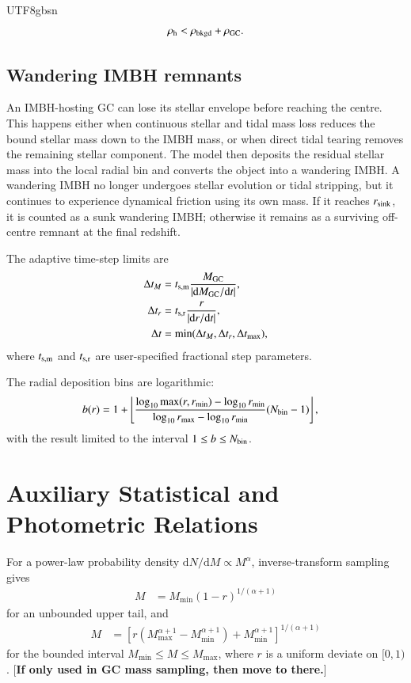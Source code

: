 \documentclass[trackchanges, twocolappendix, twocolumn]{aastex701}
\newcommand{\czkong}[1]{{\color{magenta}[\textbf{#1}]}}
\begin{document}
\begin{CJK*}{UTF8}{gbsn}
\begin{align}
\rho_{\rm h} < \rho_{\rm bkgd}+\rho_{\rm GC} .
\end{align}

\subsection{Wandering IMBH remnants}
\label{subsubsect:wandered_imbh}

An IMBH-hosting GC can lose its stellar envelope before reaching the centre. This happens either when continuous stellar and tidal mass loss reduces the bound stellar mass down to the IMBH mass, or when direct tidal tearing removes the remaining stellar component. The model then deposits the residual stellar mass into the local radial bin and converts the object into a wandering IMBH\@. A wandering IMBH no longer undergoes stellar evolution or tidal stripping, but it continues to experience dynamical friction using its own mass. If it reaches $r_{\rm sink}$, it is counted as a sunk wandering IMBH; otherwise it remains as a surviving off-centre remnant at the final redshift.

The adaptive time-step limits are
\begin{align}
\Delta t_M &= t_{\rm s,m}\dfrac{M_{\rm GC}}{|\mathrm{d}M_{\rm GC}/\mathrm{d}t|},\\
\Delta t_r &= t_{\rm s,r}\dfrac{r}{|\mathrm{d}r/\mathrm{d}t|},\\
\Delta t &= \min(\Delta t_M,\Delta t_r,\Delta t_{\max}),
\end{align}
where $t_{\rm s,m}$ and $t_{\rm s,r}$ are user-specified fractional step parameters.

The radial deposition bins are logarithmic:
\begin{align}
b(r) &= 1+\left\lfloor
\dfrac{\log_{10}\max(r,r_{\min})-\log_{10}r_{\min}}
{\log_{10}r_{\max}-\log_{10}r_{\min}}
(N_{\rm bin}-1)
\right\rfloor ,
\end{align}
with the result limited to the interval $1\leq b\leq N_{\rm bin}$.

\section{Auxiliary Statistical and Photometric Relations}
\label{app:auxiliary_equations}

For a power-law probability density $\mathrm{d}N/\mathrm{d}M\propto M^{\alpha}$, inverse-transform sampling gives
\begin{align}
M &= M_{\min}(1-r)^{1/(\alpha+1)}
\end{align}
for an unbounded upper tail, and
\begin{align}
M &=
\left[
r\left(M_{\max}^{\alpha+1}-M_{\min}^{\alpha+1}\right)
+M_{\min}^{\alpha+1}
\right]^{1/(\alpha+1)}
\end{align}
for the bounded interval $M_{\min}\leq M\leq M_{\max}$, where $r$ is a uniform deviate on $[0,1)$. \czkong{If only used in GC mass sampling, then move to there.}


\end{CJK*}
\end{document}
